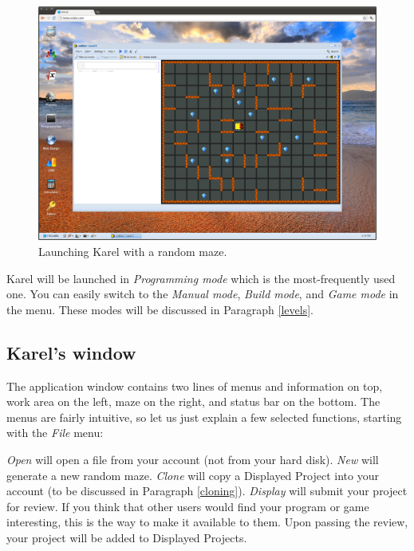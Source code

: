 \begin{figure}[!ht]
\begin{center}
\includegraphics[width=\textwidth]{imgk/init.png}
\end{center}
\vspace{-2mm}
\caption{Launching Karel with a random maze.}
\label{fig:init}
\end{figure}
\noindent
Karel will be launched in {\em Programming mode} which is the most-frequently 
used one. You can easily switch to the {\em Manual mode}, {\em Build mode},
and {\em Game mode} in the menu. These modes will be discussed in Paragraph 
\ref{levels}.

\subsection{Karel's window} \label{menu}

The application window contains two lines of menus and information on top,
work area on the left, maze on the right, and status bar on the bottom.
The menus are fairly intuitive, so let us just explain a few selected 
functions, starting with the {\em File} menu:

{\em Open} will open a file from your account (not from your hard disk). {\em New} will generate a new random maze.
{\em Clone} will copy a Displayed Project into your account (to be discussed in Paragraph \ref{cloning}). 
{\em Display} will submit your project for review. If you think that 
      other users would find your program or game interesting, this is the way to make it 
      available to them. Upon passing the review, your project will be added to Displayed Projects.

